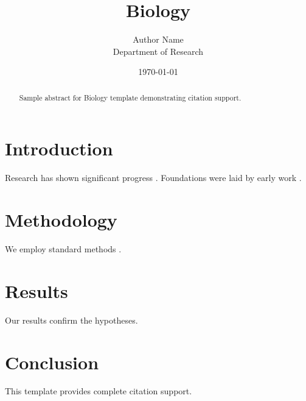 \documentclass{mdpi}
\title{Biology}
\author{Author Name \\ \small Department of Research}
\date{\today}
\begin{document}
\maketitle

\begin{abstract}
Sample abstract for Biology template demonstrating citation support.
\end{abstract}

\section{Introduction}
Research has shown significant progress \citep{einstein1905}. Foundations were laid by early work \citep{turing1950}.

\section{Methodology}
We employ standard methods \citep{knuth1984}.

\section{Results}
Our results confirm the hypotheses.

\section{Conclusion}
This template provides complete citation support.



\end{document}
